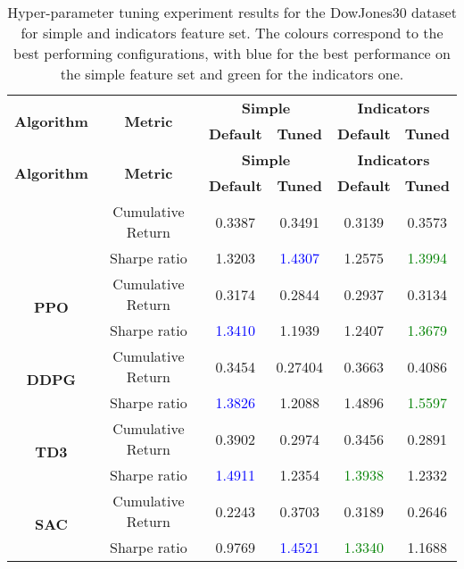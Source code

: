 \begin{longtable}{|c|c|c|c|c|c|}
    \caption{Hyper-parameter tuning experiment results for the DowJones30 dataset for simple and indicators feature set. The colours correspond to the best performing configurations, with blue for the best performance on the simple feature set and green for the indicators one.}
    \label{tab:experiment_hyperparameters_dow30}
    \\ 
    \hline
    \multirow{2}{*}{\textbf{Algorithm}} & \multirow{2}{*}{\textbf{Metric}} & \multicolumn{2}{c|}{\textbf{Simple}} & \multicolumn{2}{c|}{\textbf{Indicators}} \\
\cline{3-6}
     &  & \textbf{Default} & \textbf{Tuned} & \textbf{Default} & \textbf{Tuned} \\ \midrule
    \endfirsthead

    \hline
    \multirow{2}{*}{\textbf{Algorithm}} & \multirow{2}{*}{\textbf{Metric}} & \multicolumn{2}{c|}{\textbf{Simple}} & \multicolumn{2}{c|}{\textbf{Indicators}} \\
\cline{3-6}
     &  & \textbf{Default} & \textbf{Tuned} & \textbf{Default} & \textbf{Tuned} \\ \midrule
    \endhead

    \endfoot
 
    \multirow{2}{*}{\textbf{A2C}}
    & Cumulative Return & 0.3387 & 0.3491 & 0.3139 & 0.3573 \\ \cline{2-6}
    & Sharpe ratio & 1.3203 & \textcolor{blue}{1.4307} & 1.2575 & \textcolor{green}{1.3994} \\ \midrule

    \multirow{2}{*}{\textbf{PPO}}
    & Cumulative Return & 0.3174 & 0.2844 & 0.2937 & 0.3134 \\ \cline{2-6}
    & Sharpe ratio & \textcolor{blue}{1.3410} & 1.1939 & 1.2407 & \textcolor{green}{1.3679} \\ \midrule

    \multirow{2}{*}{\textbf{DDPG}}
    & Cumulative Return & 0.3454 & 0.27404 & 0.3663 & 0.4086 \\ \cline{2-6}
    & Sharpe ratio & \textcolor{blue}{1.3826} & 1.2088 & 1.4896 & \textcolor{green}{1.5597} \\ \midrule

    \multirow{2}{*}{\textbf{TD3}}
    & Cumulative Return & 0.3902 & 0.2974 & 0.3456 & 0.2891 \\ \cline{2-6}
    & Sharpe ratio & \textcolor{blue}{1.4911} & 1.2354 & \textcolor{green}{1.3938} & 1.2332 \\ \midrule

    \multirow{2}{*}{\textbf{SAC}}
    & Cumulative Return & 0.2243 & 0.3703 & 0.3189 & 0.2646 \\ \cline{2-6}
    & Sharpe ratio & 0.9769 & \textcolor{blue}{1.4521} & \textcolor{green}{1.3340} & 1.1688 \\ \midrule
\end{longtable}